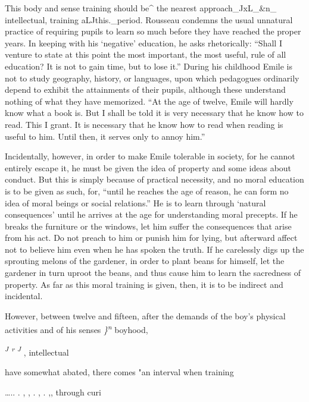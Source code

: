 \documentclass[]{book}
\begin{document}
This body and sense training should be\^{} the nearest approach\_JxL\_\&n\_ intellectual, training aLJthis.\_period. Rousseau condemns the usual unnatural practice of requiring pupils to learn so much before they have reached the proper years. In keeping with his `negative' education, he asks rhetorically: ``Shall I venture to state at this point the most important, the most useful, rule of all education? It is not to gain time, but to lose it.'' During his childhood Emile is not to study geography, history, or languages, upon which pedagogues ordinarily depend to exhibit the attainments of their pupils, although these understand nothing of what they have memorized. ``At the age of twelve, Emile will hardly know what a book is. But I shall be told it is very necessary that he know how to read. This I grant. It is necessary that he know how to read when reading is useful to him. Until then, it serves only to annoy him.''

Incidentally, however, in order to make Emile tolerable in society, for he cannot entirely escape it, he must be given the idea of property and some ideas about conduct. But this is simply because of practical necessity, and no moral education is to be given as such, for, ``until he reaches the age of reason, he can form no idea of moral beings or social relations.'' He is to learn through `natural consequences' until he arrives at the age for understanding moral precepts. If he breaks the furniture or the windows, let him suffer the consequences that arise from his act. Do not preach to him or punish him for lying, but afterward affect not to believe him even when\protect\hypertarget{ch19.xmlux5cux23para.272.1.0.box.139.243.1048.304.q.60}{}{ he has spoken the truth. If he carelessly digs up the sprouting melons of the gardener, in order to plant beans for himself, let the gardener in turn uproot the beans, and thus cause him to learn the sacredness of property. As far as this moral training is given, then, it is to be indirect and incidental.}

However, between twelve and fifteen, after the demands of the boy's physical activities and of his senses \emph{\}\textsuperscript{n}} boyhood,

\emph{\textsuperscript{J} \textsuperscript{r} \textsuperscript{J}} , intellectual

have somewhat abated, there comes "an interval when training

\ldots{}.. . , , . , . ,, through curi
\end{document}

